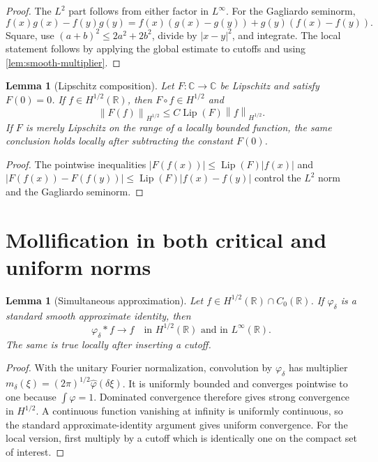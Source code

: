 \documentclass[11pt,oneside]{book}
\newtheorem{lemma}[theorem]{Lemma}
\theoremstyle{definition}
\theoremstyle{remark}
\newcommand{\R}{\mathbb R}
\newcommand{\C}{\mathbb C}
\newcommand{\1}{\mathbf 1}
\newcommand{\norm}[1]{\left\lVert #1\right\rVert}
\begin{document}
\begin{proof}
The $L^2$ part follows from either factor in $L^\infty$.  For the Gagliardo
seminorm,
\[
 f(x)g(x)-f(y)g(y)
 =f(x)(g(x)-g(y))+g(y)(f(x)-f(y)).
\]
Square, use $(a+b)^2\le2a^2+2b^2$, divide by $|x-y|^2$, and integrate.
The local statement follows by applying the global estimate to cutoffs and
using \cref{lem:smooth-multiplier}.
\end{proof}

\begin{lemma}[Lipschitz composition]\label{lem:Lip-composition}
Let $F:\C\to\C$ be Lipschitz and satisfy $F(0)=0$.  If
$f\in H^{1/2}(\R)$, then $F\circ f\in H^{1/2}$ and
\[
 \norm{F(f)}_{H^{1/2}}\le C\operatorname{Lip}(F)\norm f_{H^{1/2}}.
\]
If $F$ is merely Lipschitz on the range of a locally bounded function, the
same conclusion holds locally after subtracting the constant $F(0)$.
\end{lemma}

\begin{proof}
The pointwise inequalities
$|F(f(x))|\le\operatorname{Lip}(F)|f(x)|$ and
$|F(f(x))-F(f(y))|\le\operatorname{Lip}(F)|f(x)-f(y)|$ control the $L^2$
norm and the Gagliardo seminorm.
\end{proof}

\section{Mollification in both critical and uniform norms}

\begin{lemma}[Simultaneous approximation]\label{lem:simultaneous-mollification}
Let $f\in H^{1/2}(\R)\cap C_0(\R)$.  If $\varphi_\delta$ is a standard smooth
approximate identity, then
\[
 \varphi_\delta*f\to f
 \quad\text{in }H^{1/2}(\R)\text{ and in }L^\infty(\R).
\]
The same is true locally after inserting a cutoff.
\end{lemma}

\begin{proof}
With the unitary Fourier normalization, convolution by
$\varphi_\delta$ has multiplier
$m_\delta(\xi)=(2\pi)^{1/2}\widehat\varphi(\delta\xi)$.
It is uniformly bounded and converges pointwise to one because
$\int\varphi=1$.  Dominated convergence therefore gives strong
convergence in $H^{1/2}$.
A continuous function vanishing at infinity is uniformly continuous, so the
standard approximate-identity argument gives uniform convergence.  For the
local version, first multiply by a cutoff which is identically one on the
compact set of interest.
\end{proof}
\end{document}

